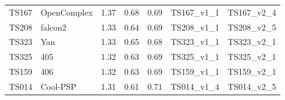 \begin{table}[ht]
{\begin{tabular}{llrrrll}
TS167 & OpenComplex & 1.37 & 0.68 & 0.69 & TS167\_v1\_1 & TS167\_v2\_4 \\ 
TS208 & falcon2 & 1.33 & 0.64 & 0.69 & TS208\_v1\_1 & TS208\_v2\_5 \\ 
TS323 & Yan & 1.33 & 0.65 & 0.68 & TS323\_v1\_1 & TS323\_v2\_1 \\ 
TS325 & 405 & 1.32 & 0.63 & 0.69 & TS325\_v1\_1 & TS325\_v2\_1 \\ 
TS159 & 406 & 1.32 & 0.63 & 0.69 & TS159\_v1\_1 & TS159\_v2\_1 \\ 
TS014 & Cool-PSP & 1.31 & 0.61 & 0.71 & TS014\_v1\_4 & TS014\_v2\_5 \\ 
\bottomrule
\end{tabular}%
}
\end{table}
